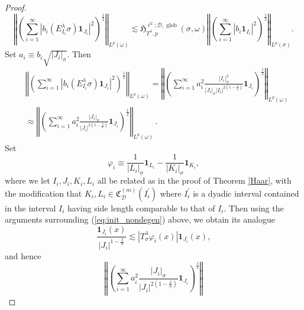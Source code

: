 \documentclass{amsart}%
\theoremstyle{plain}
\numberwithin{equation}{section}
\begin{document}
\begin{proof}
\begin{equation}
\left\Vert \left(  \sum_{i=1}^{\infty}\left\vert b_{i}\left(  E_{I_{i}%
}^{\lambda}\sigma\right)  \mathbf{1}_{J_{i}}\right\vert ^{2}\right)
^{\frac{1}{2}}\right\Vert _{L^{p}\left(  \omega\right)  }\lesssim
\mathfrak{H}_{T^{\lambda},p}^{\ell^{2};\mathcal{D},\operatorname*{glob}%
}\left(  \sigma,\omega\right)  \left\Vert \left(  \sum_{i=1}^{\infty
}\left\vert b_{i}\mathbf{1}_{I_{i}}\right\vert ^{2}\right)  ^{\frac{1}{2}%
}\right\Vert _{L^{p}\left(  \sigma\right)  }.\label{control}%
\end{equation}
Set $a_{i}\equiv b_{i}\sqrt{\left\vert J_{i}\right\vert _{\sigma}}$. Then%
\begin{align*}
&  \left\Vert \left(  \sum_{i=1}^{\infty}\left\vert b_{i}\left(  E_{I_{i}%
}^{\lambda}\sigma\right)  \mathbf{1}_{J_{i}}\right\vert ^{2}\right)
^{\frac{1}{2}}\right\Vert _{L^{p}\left(  \omega\right)  }=\left\Vert \left(
\sum_{i=1}^{\infty}a_{i}^{2}\frac{\left\vert I_{i}\right\vert _{\sigma}^{2}%
}{\left\vert J_{i}\right\vert _{\sigma}\left\vert I_{i}\right\vert ^{2\left(
1-\frac{\lambda}{n}\right)  }}\mathbf{1}_{J_{i}}\right)  ^{\frac{1}{2}%
}\right\Vert _{L^{p}\left(  \omega\right)  }\\
&  \approx\left\Vert \left(  \sum_{i=1}^{\infty}a_{i}^{2}\frac{\left\vert
J_{i}\right\vert _{\sigma}}{\left\vert J_{i}\right\vert ^{2\left(
1-\frac{\lambda}{n}\right)  }}\mathbf{1}_{J_{i}}\right)  ^{\frac{1}{2}%
}\right\Vert _{L^{p}\left(  \omega\right)  }\,.
\end{align*}
Set
\[
\varphi_{i}\equiv\frac{1}{\left\vert L_{i}\right\vert _{\sigma}}%
\mathbf{1}_{L_{i}}-\frac{1}{\left\vert K_{i}\right\vert _{\sigma}}%
\mathbf{1}_{K_{i}},
\]
where we let $I_{i},J_{i},K_{i},L_{i}$ all be related as in the proof of
Theorem \ref{Haar}, with the modification that $K_{i},L_{i}\in\mathfrak{C}%
^{\left(  m\right)  }_{\mathcal{D}}\left(  I_{i}^{\prime}\right)  $ where
$I_{i}^{\prime}$ is a dyadic interval contained in the interval $I_{i}$ having
side length comparable to that of $I_{i}$. Then using the arguments
surrounding (\ref{eq:init_nondegen}) above, we obtain its analogue
\[
\frac{\mathbf{1}_{J_{i}}\left(  x\right)  }{\left\vert J_{i}\right\vert
^{1-\frac{\lambda}{n}}}\lesssim\left\vert T_{\sigma}^{\lambda}\varphi
_{i}\left(  x\right)  \right\vert \mathbf{1}_{J_{i}}\left(  x\right)  ,
\]
and hence
\[
\left\Vert \left(  \sum_{i=1}^{\infty}a_{i}^{2}\frac{\left\vert J_{i}%
\right\vert _{\sigma}}{\left\vert J_{i}\right\vert ^{2\left(  1-\frac{\lambda
}{n}\right)  }}\mathbf{1}_{J_{i}}\right)  ^{\frac{1}{2}}\right\Vert
\]
\end{proof}
\end{document}
